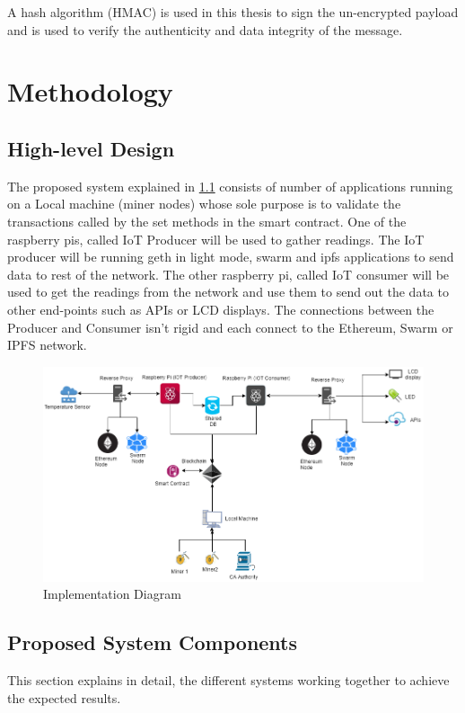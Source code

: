 \documentclass[11pt,openright]{report}
\begin{document}
A hash algorithm (HMAC) is used in this thesis to sign the un-encrypted payload and is used to verify the authenticity and data integrity of the message. 



\chapter{Methodology} \label{chapter:proposed_system}

\section{High-level Design} \label{ss:construct_architecture}
The proposed system explained in \ref{fig:impldiagram_architechture} consists of number of applications running on a Local machine (miner nodes) whose sole purpose is to validate the transactions called by the set methods in the smart contract. One of the raspberry pis, called IoT Producer will be used to gather readings. The IoT producer will be running geth in light mode, swarm and ipfs applications to send data to rest of the network. The other raspberry pi, called IoT consumer will be used to get the readings from the network and use them to send out the data to other end-points such as APIs or LCD displays. The connections between the Producer and Consumer isn't rigid and each connect to the Ethereum, Swarm or IPFS network.

\begin{figure}
	\centering
	\includegraphics[scale=0.5]{images/Final_Implementation.png}
	\caption{Implementation Diagram}
	\label{fig:impldiagram_architechture}
\end{figure}


\section{Proposed System Components}
This section explains in detail, the different systems working together to achieve the expected results.
\end{document}
